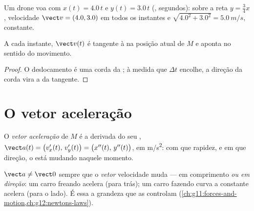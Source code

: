 \begin{example}\label{ex:g12:kinematics-2d:drone}
Um drone voa com $x(t) = 4.0\,t$ e $y(t) = 3.0\,t$ (, segundos):
 sobre a reta $y = \tfrac34 x$, velocidade
$\vect v = (4.0, 3.0)$ em todos os instantes e 
$\sqrt{4.0^2 + 3.0^2} = \qty{5.0}{m/s}$, constante.
\end{example}

\begin{proposition}\label{prop:g12:kinematics-2d:tangent}
A cada instante, $\vect v(t)$ é tangente à  na posição atual de
$M$ e aponta no sentido do movimento.
\end{proposition}

\begin{proof}
O deslocamento é uma corda da ; à medida que $\Delta t$
encolhe, a direção da corda vira a da tangente.
\end{proof}

\section{O vetor aceleração}

\begin{definition}\label{def:g12:kinematics-2d:acceleration}
O \emph{vetor aceleração} de $M$ é a derivada do
seu ,
$\vect a(t) = \bigl(v_x'(t),\, v_y'(t)\bigr) =
\bigl(x''(t),\, y''(t)\bigr)$, em \unit{m/s^2}: com que rapidez, e em que
direção, o  está mudando naquele momento.
\end{definition}

\begin{remark}\label{rem:g12:kinematics-2d:turning}
$\vect a \neq \vect 0$ sempre que o \emph{vetor} velocidade muda --- em
comprimento \emph{ou em direção}: um carro freando acelera (para trás);
um carro fazendo curva a  constante acelera (para o
lado). É essa a grandeza que as  controlam
(\cref{ch:g11:forces-and-motion,ch:g12:newtons-laws}).
\end{remark}

